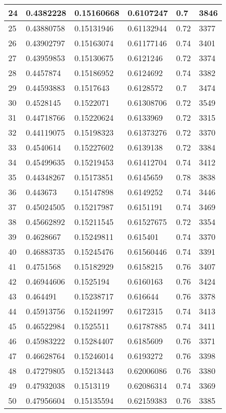 \begin{longtable}{|l|l|l|l|l|l|}
24 & 0.4382228 & 0.15160668 & 0.6107247 & 0.7 & 3846 \\ \hline 
25 & 0.43880758 & 0.15131946 & 0.61132944 & 0.72 & 3377 \\ \hline 
26 & 0.43902797 & 0.15163074 & 0.61177146 & 0.74 & 3401 \\ \hline 
27 & 0.43959853 & 0.15130675 & 0.6121246 & 0.72 & 3374 \\ \hline 
28 & 0.4457874 & 0.15186952 & 0.6124692 & 0.74 & 3382 \\ \hline 
29 & 0.44593883 & 0.1517643 & 0.6128572 & 0.7 & 3474 \\ \hline 
30 & 0.4528145 & 0.1522071 & 0.61308706 & 0.72 & 3549 \\ \hline 
31 & 0.44718766 & 0.15220624 & 0.6133969 & 0.72 & 3315 \\ \hline 
32 & 0.44119075 & 0.15198323 & 0.61373276 & 0.72 & 3370 \\ \hline 
33 & 0.4540614 & 0.15227602 & 0.6139138 & 0.72 & 3384 \\ \hline 
34 & 0.45499635 & 0.15219453 & 0.61412704 & 0.74 & 3412 \\ \hline 
35 & 0.44348267 & 0.15173851 & 0.6145659 & 0.78 & 3838 \\ \hline 
36 & 0.443673 & 0.15147898 & 0.6149252 & 0.74 & 3446 \\ \hline 
37 & 0.45024505 & 0.15217987 & 0.6151191 & 0.74 & 3469 \\ \hline 
38 & 0.45662892 & 0.15211545 & 0.61527675 & 0.72 & 3354 \\ \hline 
39 & 0.4628667 & 0.15249811 & 0.615401 & 0.74 & 3370 \\ \hline 
40 & 0.46883735 & 0.15245476 & 0.61560446 & 0.74 & 3391 \\ \hline 
41 & 0.4751568 & 0.15182929 & 0.6158215 & 0.76 & 3407 \\ \hline 
42 & 0.46944606 & 0.1525194 & 0.6160163 & 0.76 & 3424 \\ \hline 
43 & 0.464491 & 0.15238717 & 0.616644 & 0.76 & 3378 \\ \hline 
44 & 0.45913756 & 0.15241997 & 0.6172315 & 0.74 & 3413 \\ \hline 
45 & 0.46522984 & 0.1525511 & 0.61787885 & 0.74 & 3411 \\ \hline 
46 & 0.45983222 & 0.15284407 & 0.6185609 & 0.76 & 3371 \\ \hline 
47 & 0.46628764 & 0.15246014 & 0.6193272 & 0.76 & 3398 \\ \hline 
48 & 0.47279805 & 0.15213443 & 0.62006086 & 0.76 & 3380 \\ \hline 
49 & 0.47932038 & 0.1513119 & 0.62086314 & 0.74 & 3369 \\ \hline 
50 & 0.47956604 & 0.15135594 & 0.62159383 & 0.76 & 3385 \\ \hline 
\end{longtable}
